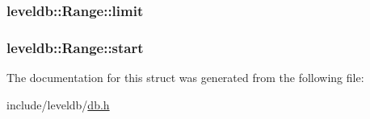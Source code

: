 \subsubsection[{limit}]{ leveldb\+::\+Range\+::limit}\label{structleveldb_1_1_range_a9c45c46ac20a1c86c265f1f9c35d6632}
\hypertarget{structleveldb_1_1_range_ad80a55e20eb7d864d497e8f94953c00d}{}
\subsubsection[{start}]{ leveldb\+::\+Range\+::start}\label{structleveldb_1_1_range_ad80a55e20eb7d864d497e8f94953c00d}


The documentation for this struct was generated from the following file\+:\begin{DoxyCompactItemize}
\item 
include/leveldb/\hyperlink{db_8h}{db.\+h}\end{DoxyCompactItemize}
